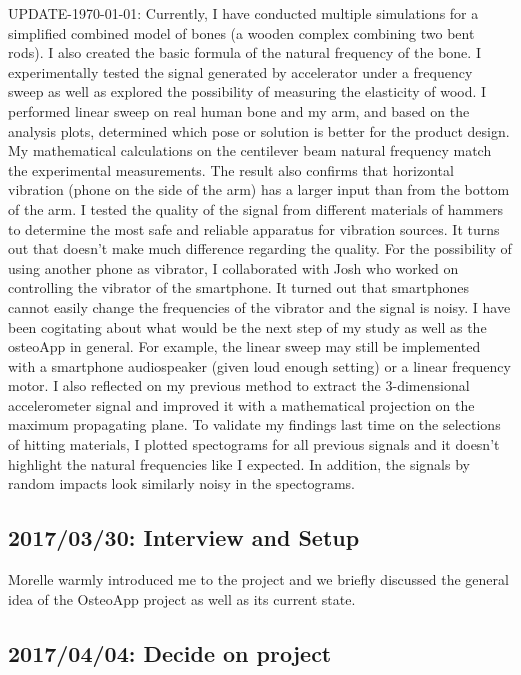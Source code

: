 \documentclass{sigchi}
\begin{document}
UPDATE-\today: Currently, I have conducted multiple simulations for a simplified combined model of bones (a wooden complex combining two bent rods). I also created the basic formula of the natural frequency of the bone. I experimentally tested the signal generated by accelerator under a frequency sweep as well as explored the possibility of measuring the elasticity of wood. I performed linear sweep on real human bone and my arm, and based on the analysis plots, determined which pose or solution is better for the product design. My mathematical calculations on the centilever beam natural frequency match the experimental measurements. The result also confirms that horizontal vibration (phone on the side of the arm) has a larger input than from the bottom of the arm. I tested the quality of the signal from different materials of hammers to determine the most safe and reliable apparatus for vibration sources. It turns out that doesn't make much difference regarding the quality. For the possibility of using another phone as vibrator, I collaborated with Josh who worked on controlling the vibrator of the smartphone. It turned out that smartphones cannot easily change the frequencies of the vibrator and the signal is noisy. I have been cogitating about what would be the next step of my study as well as the osteoApp in general. For example, the linear sweep may still be implemented with a smartphone audiospeaker (given loud enough setting) or a linear frequency motor. I also reflected on my previous method to extract the 3-dimensional accelerometer signal and improved it with a mathematical projection on the maximum propagating plane. To validate my findings last time on the selections of hitting materials, I plotted spectograms for all previous signals and it doesn't highlight the natural frequencies like I expected. In addition, the signals by random impacts look similarly noisy in the spectograms.

\subsection{2017/03/30: Interview and Setup}

Morelle warmly introduced me to the project and we briefly discussed the general idea of the OsteoApp project as well as its current state. 

\subsection{2017/04/04: Decide on project}
\end{document}
